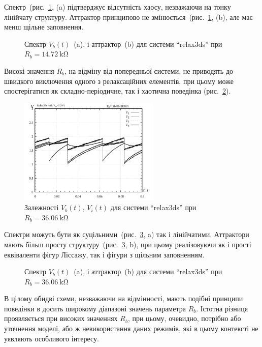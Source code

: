 Спектр~(рис.~\ref{atu:f:relax3ds_f_14718}, (a) підтверджує відсутність хаосу,
незважаючи на тонку лінійчату структуру. Аттрактор принципово
не змінюється~(рис.~\ref{atu:f:relax3ds_f_14718}, (b), але має менш щільне
заповнення.

\begin{figure}[htb!]
  \caption{Спектр $V_b(t)$~(a), і аттрактор~(b) для системи ``relax3ds'' при $R_b=\SI{14.72}{\kilo \ohm} $}
  \label{atu:f:relax3ds_f_14718}
\end{figure}

Високі значення
$R_b$, на відміну від попередньої системи, не приводять до швидкого
виключення одного з релаксаційних елементів, при цьому може
спостерігатися як складно-періодичне, так і хаотична поведінка
(рис.~\ref{atu:f:relax3ds_t_36060}).

\begin{figure}[htb!]
  \centerline{\includegraphics[width=0.6\textwidth]{p/relax3ds_t_036060.png} }
  \caption{Залежності $V_b(t)$, $V_i(t)$ для системи ``relax3ds'' при $R_b = \SI{36.06}{\kilo\ohm} $}
  \label{atu:f:relax3ds_t_36060}
\end{figure}

Спектри можуть бути як суцільними~(рис.~\ref{atu:f:relax3ds_f_36060},
a) так і лінійчатими. Аттрактори мають більш просту
структуру~(рис.~\ref{atu:f:relax3ds_f_36060}, b), при цьому реалізовуючи як
і прості еквіваленти фігур Ліссажу, так і фігури з щільним
заповненням.

\begin{figure}[htb!]
  \caption{Спектр $V_b(t)$~(a), і аттрактор~(b) для системи ``relax3ds'' при $R_b=\SI{36.06}{\kilo \ohm} $}
  \label{atu:f:relax3ds_f_36060}
\end{figure}

В цілому обидві схеми, незважаючи на відмінності, мають подібні
принципи поведінки в досить широкому діапазоні значень
параметра
$R_b$. Істотна різниця проявляється при високих значеннях
$R_b$, при цьому, очевидно, потрібно або уточнення моделі, або ж
невикористання даних режимів, які в цьому контексті не уявляють
особливого інтересу.


